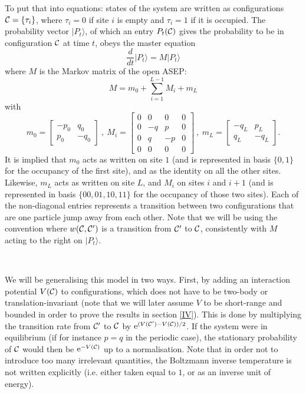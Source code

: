 \documentclass[aps,pre,onecolumn,showpacs,showkeys,a4paper]{revtex4-1}
\begin{document}
To put that into equations: states of the system are written as configurations ${\cal C}=\{\tau_i\}$, where $\tau_i=0$ if site $i$ is empty and $\tau_i=1$ if it is occupied. The probability vector $|P_{t}\rangle$, of which an entry $P_{t}({\cal C})$ gives the probability to be in configuration ${\cal C}$ at time $t$, obeys the master equation
\begin{equation}\label{MP}
\frac{d}{dt}|P_{t}\rangle=M|P_{t}\rangle
\end{equation}
where $M$ is the Markov matrix of the open ASEP:
\begin{equation}\label{M}
M=m_0+\sum\limits_{i=1}^{L-1}M_i +m_L
\end{equation}
with
\begin{equation}\label{M2}
m_0=\begin{bmatrix} -p_0 & q_0 \\ p_0 & -q_0  \end{bmatrix}~,~ M_{i}=\begin{bmatrix} 0 & 0 & 0 & 0 \\ 0 & -q & p & 0 \\ 0 & q & -p & 0 \\ 0 & 0 & 0 & 0 \end{bmatrix}~,~m_L=\begin{bmatrix} -q_L & p_L \\ q_L & -q_L  \end{bmatrix}.
\end{equation}
It is implied that $m_0$ acts as written on site $1$ (and is represented in basis $\{0,1\}$ for the occupancy of the first site), and as the identity on all the other sites. Likewise, $m_L$ acts as written on site $L$, and $M_i$ on sites $i$ and $i+1$ (and is represented in basis $\{00,01,10,11\}$ for the occupancy of those two sites). Each of the non-diagonal entries represents a transition between two configurations that are one particle jump away from each other. Note that we will be using the convention where $w(\cal{C},\cal{C}')$ is a transition from $\cal{C}'$ to $\cal{C}$, consistently with $M$ acting to the right on $|P_{t}\rangle$.

~

We will be generalising this model in two ways. First, by adding an interaction potential $V({\cal C})$ to configurations, which does not have to be two-body or translation-invariant (note that we will later assume $V$ to be short-range and bounded in order to prove the results in section \ref{IV}). This is done by multiplying the transition rate from ${\cal C}'$ to ${\cal C}$ by ${\rm e}^{(V({\cal C}')-V({\cal C}))/2}$. If the system were in equilibrium (if for instance $p=q$ in the periodic case), the stationary probability of ${\cal C}$ would then be ${\rm e}^{-V({\cal C})}$ up to a normalisation. Note that in order not to introduce too many irrelevant quantities, the Boltzmann inverse temperature is not written explicitly (i.e. either taken equal to $1$, or as an inverse unit of energy).
\end{document}

